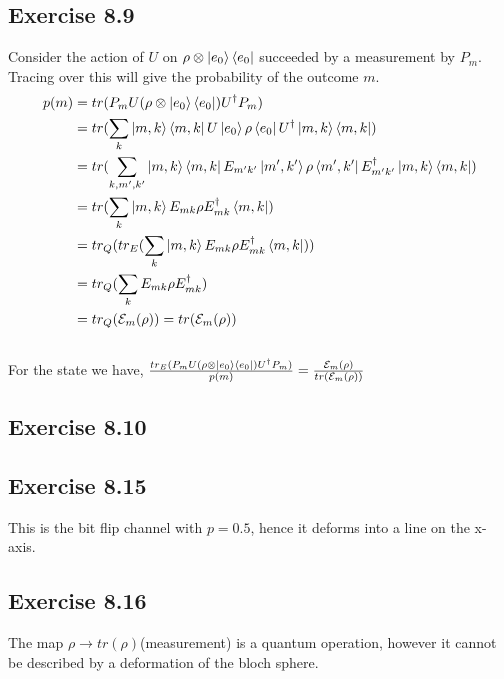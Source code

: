 \documentclass[a4paper,12pt]{article}
\begin{document}
\subsection*{Exercise 8.9}
Consider the action of $U$ on $\rho\otimes \ket{e_0}\bra{e_0}$ succeeded by a measurement by $P_m$.
Tracing over this will give the probability of the outcome $m$.\\
\begin{align*}
    p(m)&=tr(P_m U(\rho\otimes \ket{e_0}\bra{e_0})U^\dagger P_m)\\
&=tr(\displaystyle \sum_k \ket{m,k}\bra{m,k}U\ket{e_0}\rho\bra{e_0}U^\dagger \ket{m,k}\bra{m,k})\\
&=tr(\displaystyle \sum_{k,m^\prime,k^\prime} \ket{m,k}\bra{m,k}E_{m^\prime k^\prime}\ket{m^\prime, k^\prime}
\rho\bra{m^\prime, k^\prime}E_{m^\prime k^\prime}^\dagger \ket{m,k}\bra{m,k})\\
&=tr(\displaystyle \sum_{k} \ket{m,k}E_{m k}
\rho E_{mk}^\dagger\bra{m,k})\\
&=tr_Q(tr_E(\displaystyle \sum_{k} \ket{m,k}E_{mk}
\rho E_{mk}^\dagger\bra{m,k}))\\
&=tr_Q(\displaystyle \sum_{k} E_{mk}
\rho E_{mk}^\dagger)\\
&=tr_Q(\mathcal{E}_m(\rho))=tr(\mathcal{E}_m(\rho))
\end{align*}\\

For the state we have,
$\frac{tr_E(P_m U(\rho\otimes \ket{e_0}\bra{e_0})U^\dagger P_m)}{p(m)}=\frac{\mathcal{E}_m(\rho)}{tr(\mathcal{E}_m(\rho))}$
\subsection*{Exercise 8.10}
\subsection*{Exercise 8.15}
This is the bit flip channel with $p=0.5$, hence it deforms into a line on the x-axis.
\subsection*{Exercise 8.16}
The map $\rho \rightarrow tr(\rho)$(measurement) is a quantum operation, however it cannot be described by a deformation of the
bloch sphere.
\end{document}
